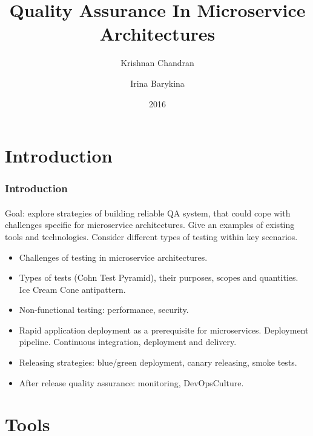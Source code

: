 \documentclass{beamer}
\title{Quality Assurance In Microservice Architectures}
\author{Krishnan Chandran \and Irina Barykina}
\institute[NYU]
{
Department of Informatics,\\
Intelligent Adaptive Systems, UHH\\
}
\date{2016}
\begin{document}
\begin{frame}
\titlepage
\end{frame}


\section{Introduction}

\begin{frame}
	\frametitle{Introduction}	
	\framesubtitle{}
	Goal: explore strategies of building reliable QA system, that could cope with challenges specific for microservice architectures. Give an examples of existing tools and technologies.
        Consider different types of testing within key scenarios.

	\begin{itemize}
 		 \item Challenges of testing in microservice architectures.
		 \item Types of tests (Cohn Test Pyramid), their purposes, scopes and quantities. Ice Cream Cone antipattern.
		 \item Non-functional testing: performance, security.
		 \item Rapid application deployment as a prerequisite for microservices. Deployment pipeline. Continuous integration, deployment and delivery.
		 \item Releasing strategies: blue/green deployment, canary releasing, smoke tests.
		 \item After release quality assurance: monitoring, DevOpsCulture. 
	\end{itemize}
\end{frame}


\section{Tools}
\end{document}
